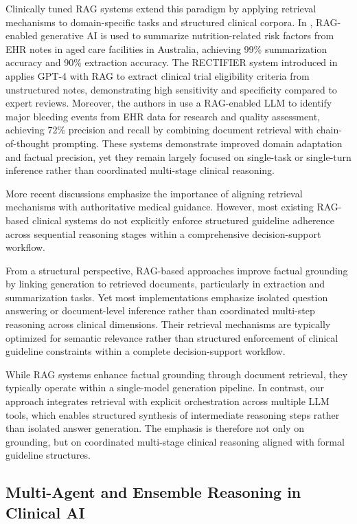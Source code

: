 \documentclass[preprint,12pt]{elsarticle}
\begin{document}
Clinically tuned RAG systems extend this paradigm by applying retrieval mechanisms to domain-specific tasks and structured clinical corpora. In \cite{r17}, RAG-enabled generative AI is used to summarize nutrition-related risk factors from EHR notes in aged care facilities in Australia, achieving 99\% summarization accuracy and 90\% extraction accuracy. The RECTIFIER system introduced in \cite{r18} applies GPT-4 with RAG to extract clinical trial eligibility criteria from unstructured notes, demonstrating high sensitivity and specificity compared to expert reviews. Moreover, the authors in \cite{r19} use a RAG-enabled LLM to identify major bleeding events from EHR data for research and quality assessment, achieving 72\% precision and recall by combining document retrieval with chain-of-thought prompting. These systems demonstrate improved domain adaptation and factual precision, yet they remain largely focused on single-task or single-turn inference rather than coordinated multi-stage clinical reasoning.

More recent discussions emphasize the importance of aligning retrieval mechanisms with authoritative medical guidance. However, most existing RAG-based clinical systems do not explicitly enforce structured guideline adherence across sequential reasoning stages within a comprehensive decision-support workflow.

From a structural perspective, RAG-based approaches improve factual grounding by linking generation to retrieved documents, particularly in extraction and summarization tasks. Yet most implementations emphasize isolated question answering or document-level inference rather than coordinated multi-step reasoning across clinical dimensions. Their retrieval mechanisms are typically optimized for semantic relevance rather than structured enforcement of clinical guideline constraints within a complete decision-support workflow.

While RAG systems enhance factual grounding through document retrieval, they typically operate within a single-model generation pipeline. In contrast, our approach integrates retrieval with explicit orchestration across multiple LLM tools, which enables structured synthesis of intermediate reasoning steps rather than isolated answer generation. The emphasis is therefore not only on grounding, but on coordinated multi-stage clinical reasoning aligned with formal guideline structures.



\subsection{Multi-Agent and Ensemble Reasoning in Clinical AI}
\end{document}
